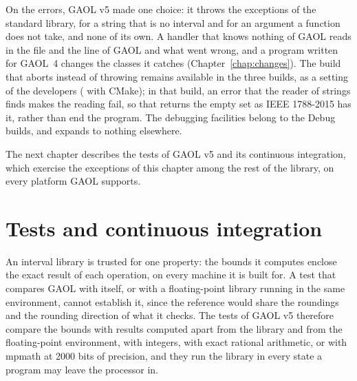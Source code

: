 \documentclass[12pt,a4paper,twoside,openright]{book}
\begin{document}
\medskip
On the errors, GAOL v5 made one choice: it throws the exceptions of the
standard library,  for a string that is no
interval and  for an argument a function does not
take, and none of its own.\newinvfive{} A handler that knows nothing of GAOL
reads in  the file and the line of GAOL and what went wrong,
and a program written for GAOL~4 changes the classes it catches
(Chapter~\ref{chap:changes}). The build that aborts instead of throwing
remains available in the three builds, as a setting of the developers
( with CMake); in that build, an error that the reader of strings finds
makes the reading fail, so that 
returns the empty set as IEEE 1788-2015 has it, rather than end the program.
The debugging facilities belong to the Debug builds, and
 expands to nothing elsewhere.

\medskip
The next chapter describes the tests of GAOL v5 and its continuous
integration, which exercise the exceptions of this chapter among the rest of
the library, on every platform GAOL supports.

\chapter{Tests and continuous integration}\label{chap:tests}
%
%

An interval library is trusted for one property: the bounds it computes
enclose the exact result of each operation, on every machine it is built
for. A test that compares GAOL with itself, or with a floating-point library
running in the same environment, cannot establish it, since the reference
would share the roundings and the rounding direction of what it checks. The
tests of GAOL v5 therefore compare the bounds with results computed apart
from the library and from the floating-point environment, with integers,
with exact rational arithmetic, or with mpmath at 2000 bits of precision, and
they run the library in every state a program may leave the processor in.
\end{document}
